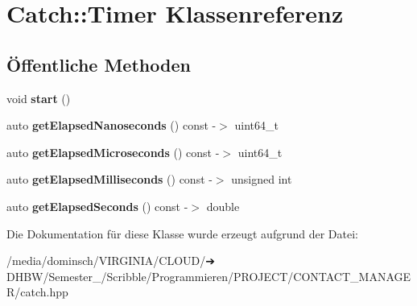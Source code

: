 \hypertarget{classCatch_1_1Timer}{}\section{Catch\+:\+:Timer Klassenreferenz}
\label{classCatch_1_1Timer}
\subsection*{Öffentliche Methoden}
\begin{DoxyCompactItemize}
\item 
\mbox{\label{classCatch_1_1Timer_a0a56e879e43f36c102bf9ea8b5fc8b72}} 
void {\bfseries start} ()
\item 
\mbox{\label{classCatch_1_1Timer_a57be5d17ca868a2d6fb1eea84de665cf}} 
auto {\bfseries get\+Elapsed\+Nanoseconds} () const -\/$>$ uint64\+\_\+t
\item 
\mbox{\label{classCatch_1_1Timer_a545de17a61a6fee1dbe3de5b0723e5fa}} 
auto {\bfseries get\+Elapsed\+Microseconds} () const -\/$>$ uint64\+\_\+t
\item 
\mbox{\label{classCatch_1_1Timer_a30aaf458dbb59dd8ac8971c9c62e0eac}} 
auto {\bfseries get\+Elapsed\+Milliseconds} () const -\/$>$ unsigned int
\item 
\mbox{\label{classCatch_1_1Timer_a065e37e3c9eb16bd4dcf41971d8deedc}} 
auto {\bfseries get\+Elapsed\+Seconds} () const -\/$>$ double
\end{DoxyCompactItemize}


Die Dokumentation für diese Klasse wurde erzeugt aufgrund der Datei\+:\begin{DoxyCompactItemize}
\item 
/media/dominsch/\+V\+I\+R\+G\+I\+N\+I\+A/\+C\+L\+O\+U\+D/➔ D\+H\+B\+W/\+Semester\+\_/\+Scribble/\+Programmieren/\+P\+R\+O\+J\+E\+C\+T/\+C\+O\+N\+T\+A\+C\+T\+\_\+\+M\+A\+N\+A\+G\+E\+R/catch.\+hpp\end{DoxyCompactItemize}
